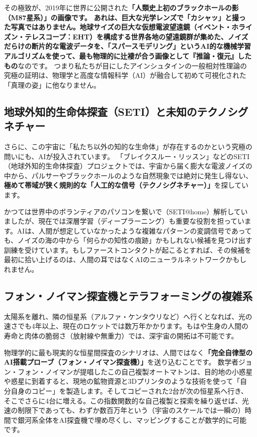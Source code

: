 その極致が、2019年に世界に公開された\textbf{「人類史上初のブラックホールの影（M87星系）」の画像です。 あれは、巨大な光学レンズで「カシャッ」と撮った写真ではありません。地球サイズの巨大な仮想電波望遠鏡（イベント・ホライズン・テレスコープ：EHT）を構成する世界各地の望遠鏡群が集めた、ノイズだらけの断片的な電波データを、「スパースモデリング」というAI的な機械学習アルゴリズムを使って、最も物理的に辻褄が合う画像として『推論・復元』したもの}なのです。 つまり私たちが目にしたアインシュタインの一般相対性理論の究極の証明は、物理学と高度な情報科学（AI）が融合して初めて可視化された「真理の姿」に他なりません。

\subsection{地球外知的生命体探査（SETI）と未知のテクノシグネチャー}

さらに、この宇宙に「私たち以外の知的な生命体」が存在するのかという究極の問いにも、AIが投入されています。 「ブレイクスルー・リッスン」などのSETI（地球外知的生命体探査）プロジェクトでは、宇宙から届く膨大な電波ノイズの中から、パルサーやブラックホールのような自然現象では絶対に発生し得ない、\textbf{極めて帯域が狭く規則的な「人工的な信号（テクノシグネチャー）」}を探しています。

かつては世界中のボランティアのパソコンを繋いで（SETI@home）解析していましたが、現在では深層学習（ディープラーニング）も重要な役割を担っています。AIは、人間が想定していなかったような複雑なパターンの変調信号であっても、ノイズの海の中から「何らかの知性の痕跡」かもしれない候補を見つけ出す訓練を受けています。もしファーストコンタクトが起こるとすれば、その候補を最初に拾い上げるのは、人間の耳ではなくAIのニューラルネットワークかもしれません。

\subsection{フォン・ノイマン探査機とテラフォーミングの複雑系}

太陽系を離れ、隣の恒星系（アルファ・ケンタウリなど）へ行くとなれば、光の速さでも4年以上、現在のロケットでは数万年かかります。もはや生身の人間の寿命と肉体の脆弱さ（放射線や無重力）では、深宇宙の開拓は不可能です。

物理学的に最も現実的な恒星間探査のシナリオは、人間ではなく\textbf{「完全自律型のAI搭載プローブ（フォン・ノイマン探査機）」}を送り込むことです。 数学者ジョン・フォン・ノイマンが提唱したこの自己複製オートマトンは、目的地の小惑星や惑星に到着すると、現地の鉱物資源と3Dプリンタのような技術を使って「自分自身のコピー」を製造します。そしてコピーされた2台が次の恒星系へ行き、そこでさらに4台に増える。この指数関数的な自己複製と探索を繰り返せば、光速の制限下であっても、わずか数百万年という（宇宙のスケールでは一瞬の）時間で銀河系全体をAI探査機で埋め尽くし、マッピングすることが数学的に可能です。


